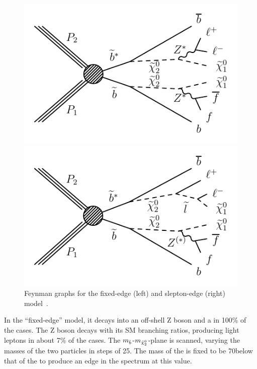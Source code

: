 \begin{figure}[htbp]
\centering
\begin{minipage}[t]{0.49\textwidth}
  \includegraphics[width=\textwidth]{plots/THEO/Feynman_graph_T6bblledge.pdf}
\end{minipage}
\begin{minipage}[t]{0.49\textwidth}
\includegraphics[width=\textwidth]{plots/THEO/Feynman_graph_T6bbslepton.pdf}
\end{minipage}
\caption{Feynman graphs for the fixed-edge (left) and slepton-edge (right) model~\cite{Khachatryan:2015lwa}.}
\label{fig:sigFeyn}
\end{figure}

 In the ``fixed-edge'' model, it decays into an off-shell Z boson and a \firstchi in 100\% of the cases. The Z boson decays with its SM branching ratios, producing light leptons in about 7\% of the cases. The $m_{\tilde{b}}$-$m_{{\tilde{\chi}^0_2}}$-plane is scanned, varying the masses of the two particles in steps of 25\GeV. The mass of the \firstchi is fixed to be 70\GeV below that of the \secondchi to produce an edge in the \mll spectrum at this value.

